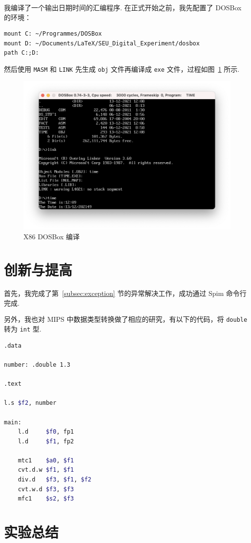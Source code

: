 \documentclass[11pt]{SEU-Digital-Report}
\begin{document}
      我编译了一个输出日期时间的汇编程序.
      在正式开始之前，我先配置了 DOSBox 的环境：
      \begin{lstlisting}
mount C: ~/Programmes/DOSBox
mount D: ~/Documents/LaTeX/SEU_Digital_Experiment/dosbox
path C:;D:
      \end{lstlisting}
      然后使用 \texttt{MASM} 和 \texttt{LINK} 先生成 \texttt{obj} 文件再编译成 \texttt{exe} 文件，过程如图~\ref{fig:dosbox} 所示.

      \begin{figure}[htbp]
        \centering
        \includegraphics[width=.6\linewidth]{fig/dosbox.png}
        \caption{X86 DOSBox 编译}
        \label{fig:dosbox}
      \end{figure}

  \section{创新与提高}

    首先，我完成了第~\ref{subsec:exception} 节的异常解决工作，成功通过 Spim 命令行完成.

    另外，我也对 MIPS 中数据类型转换做了相应的研究，有以下的代码，将 \texttt{double} 转为 \texttt{int} 型.
    \begin{lstlisting}[language=sh,tabsize=4,morekeywords={
      l,s,d,mtc1,cvt,w,div,mfc1
    },title={convert\_type.asm}]
.data

number: .double 1.3

.text

l.s $f2, number

main:
    l.d     $f0, fp1
    l.d     $f1, fp2

    mtc1    $a0, $f1
    cvt.d.w $f1, $f1
    div.d   $f3, $f1, $f2
    cvt.w.d $f3, $f3
    mfc1    $s2, $f3

    \end{lstlisting}
    
  \section{实验总结}
\end{document}
